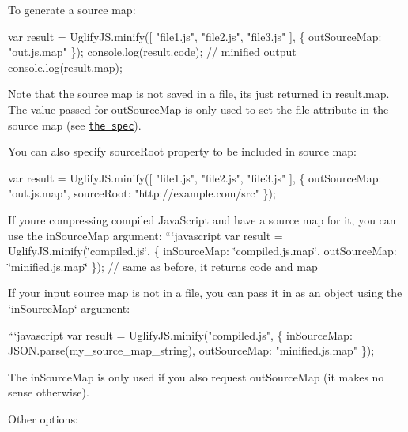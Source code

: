 To generate a source map\+: 
\begin{DoxyCode}
var result = UglifyJS.minify([ "file1.js", "file2.js", "file3.js" ], \{
    outSourceMap: "out.js.map"
\});
console.log(result.code); // minified output
console.log(result.map);
\end{DoxyCode}


Note that the source map is not saved in a file, it\textquotesingle{}s just returned in {\ttfamily result.\+map}. The value passed for {\ttfamily out\+Source\+Map} is only used to set the {\ttfamily file} attribute in the source map (see \href{https://docs.google.com/document/d/1U1RGAehQwRypUTovF1KRlpiOFze0b-_2gc6fAH0KY0k/edit}{\tt the spec}).

You can also specify source\+Root property to be included in source map\+: 
\begin{DoxyCode}
var result = UglifyJS.minify([ "file1.js", "file2.js", "file3.js" ], \{
    outSourceMap: "out.js.map",
    sourceRoot: "http://example.com/src"
\});
\end{DoxyCode}


If you\textquotesingle{}re compressing compiled Java\+Script and have a source map for it, you can use the {\ttfamily in\+Source\+Map} argument\+: ```javascript var result = Uglify\+J\+S.\+minify(\char`\"{}compiled.\+js\char`\"{}, \{ in\+Source\+Map\+: \char`\"{}compiled.\+js.\+map\char`\"{}, out\+Source\+Map\+: \char`\"{}minified.\+js.\+map\char`\"{} \}); // same as before, it returns {\ttfamily code} and {\ttfamily map} 
\begin{DoxyCode}
If your input source map is not in a file, you can pass it in as an object
using the `inSourceMap` argument:

```javascript
var result = UglifyJS.minify("compiled.js", \{
    inSourceMap: JSON.parse(my\_source\_map\_string),
    outSourceMap: "minified.js.map"
\});
\end{DoxyCode}


The {\ttfamily in\+Source\+Map} is only used if you also request {\ttfamily out\+Source\+Map} (it makes no sense otherwise).

Other options\+:


